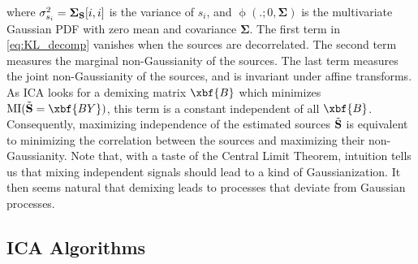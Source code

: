 where $\sigma_{s_i}^2={{\boldsymbol \Sigma_{\bf S}}}[i,i]$ is the variance of $s_i$, and $\upphi\left(.;0,\boldsymbol{\Sigma}\right)$ is the multivariate Gaussian PDF with zero mean and covariance $\boldsymbol{\Sigma}$. The first term in \eqref{eq:KL_decomp} vanishes when the sources are decorrelated. The second term measures the marginal non-Gaussianity of the sources. The last term measures the joint non-Gaussianity of the sources, and is invariant under affine transforms. As ICA looks for a demixing matrix $\xbf{B}$ which minimizes $\mathrm{MI}( \tilde{\bf S} = \xbf{B Y})$, this term is a constant independent of all $\xbf{B}$. Consequently, maximizing independence of the estimated sources $\tilde{\bf S}$ is equivalent to minimizing the correlation between the sources and maximizing their non-Gaussianity. Note that, with a taste of the Central Limit Theorem, intuition tells us that mixing independent signals should lead to a kind of Gaussianization. It then seems natural that demixing leads to processes that deviate from Gaussian processes.

\subsection{ICA Algorithms}
\label{subsec:ICAHOS}


